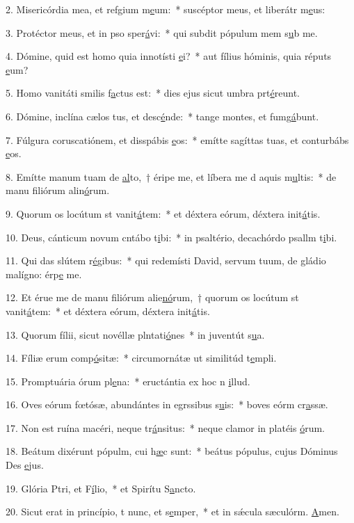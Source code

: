 2. Misericórdia mea, et refgium m\uline{e}um:~* suscéptor meus, et liberátr m\uline{e}us:\par 
3. Protéctor meus, et in pso sper\uline{á}vi:~* qui subdit pópulum mem s\uline{u}b me.\par 
4. Dómine, quid est homo quia innotísti \uline{e}i?~* aut fílius hóminis, quia réputs \uline{e}um?\par 
5. Homo vanitáti smilis f\uline{a}ctus est:~* dies ejus sicut umbra prt\uline{é}reunt.\par 
6. Dómine, inclína cælos tus, et desc\uline{é}nde:~* tange montes, et fumg\uline{á}bunt.\par 
7. Fúlgura coruscatiónem, et disspábis \uline{e}os:~* emítte sagíttas tuas, et conturbábs \uline{e}os.\par 
8. Emítte manum tuam de \uline{al}to,~† éripe me, et líbera me d aquis m\uline{u}ltis:~* de manu filiórum alin\uline{ó}rum.\par 
9. Quorum os locútum st vanit\uline{á}tem:~* et déxtera eórum, déxtera init\uline{á}tis.\par 
10. Deus, cánticum novum cntábo t\uline{i}bi:~* in psaltério, decachórdo psallm t\uline{i}bi.\par 
11. Qui das slútem r\uline{é}gibus:~* qui redemísti David, servum tuum, de gládio malígno: érp\uline{e} me.\par 
12. Et érue me de manu filiórum alie\uline{nó}rum,~† quorum os locútum st vanit\uline{á}tem:~* et déxtera eórum, déxtera init\uline{á}tis.\par 
13. Quorum fílii, sicut novéllæ plntati\uline{ó}nes~* in juventút s\uline{u}a.\par 
14. Fíliæ erum comp\uline{ó}sitæ:~* circumornátæ ut similitúd t\uline{e}mpli.\par 
15. Promptuária órum pl\uline{e}na:~* eructántia ex hoc n \uline{i}llud.\par 
16. Oves eórum fœtósæ, abundántes in egrssibus s\uline{u}is:~* boves eórm cr\uline{a}ssæ.\par 
17. Non est ruína macéri, neque tr\uline{á}nsitus:~* neque clamor in platéis \uline{ó}rum.\par 
18. Beátum dixérunt pópulm, cui h\uline{æ}c sunt:~* beátus pópulus, cujus Dóminus Des \uline{e}jus.\par 
19. Glória Ptri, et F\uline{í}lio,~* et Spirítu S\uline{a}ncto.\par 
20. Sicut erat in princípio, t nunc, et s\uline{e}mper,~* et in sǽcula sæculórm. \uline{A}men.\par 
